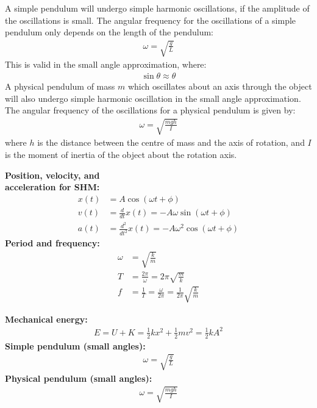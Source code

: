 \begin{chapterSummary}
A simple pendulum will undergo simple harmonic oscillations, if the amplitude of the oscillations is small. The angular frequency for the oscillations of a simple pendulum only depends on the length of the pendulum:
\begin{align*}
\omega = \sqrt{\frac{g}{L}}
\end{align*}
This is valid in the small angle approximation, where:
\begin{align*}
\sin\theta \approx \theta
\end{align*}
A physical pendulum of mass $m$ which oscillates about an axis through the object will also undergo simple harmonic oscillation in the small angle approximation. The angular frequency of the oscillations for a physical pendulum is given by:
\begin{align*}
\omega = \sqrt{\frac{mgh}{I}}
\end{align*}
where $h$ is the distance between the centre of mass and the axis of rotation, and $I$ is the moment of inertia of the object about the rotation axis.
\end{chapterSummary}

\newpage
\begin{importantEquations}
\begin{multicols}{2}
\textbf{Position, velocity, and \\acceleration for SHM:}
\begin{align*}
x(t)&= A \cos(\omega t + \phi)\\
v(t)&=\frac{d}{dt}x(t) = -A\omega\sin(\omega t + \phi)\\
a(t)&= \frac{d^2}{dt^2}x(t) = -A\omega^2\cos(\omega t + \phi)
\end{align*}
\textbf{Period and frequency:}
\begin{align*}
\omega &= \sqrt{\frac{k}{m}}\\
T&=\frac{2\pi}{\omega}=2\pi\sqrt{\frac{m}{k}}\\
f&=\frac{1}{T}=\frac{\omega}{2\pi}=\frac{1}{2\pi}\sqrt{\frac{k}{m}}
\end{align*}
\columnbreak

\textbf{Mechanical energy:}
\begin{align*}
E =U+K=\frac{1}{2}kx^2+\frac{1}{2}mv^2= \frac{1}{2}kA^2
\end{align*}
\textbf{Simple pendulum (small angles):}
\begin{align*}
\omega = \sqrt{\frac{g}{L}}
\end{align*}
\textbf{Physical pendulum (small angles):}
\begin{align*}
\omega = \sqrt{\frac{mgh}{I}}
\end{align*}
\end{multicols}
\end{importantEquations}


